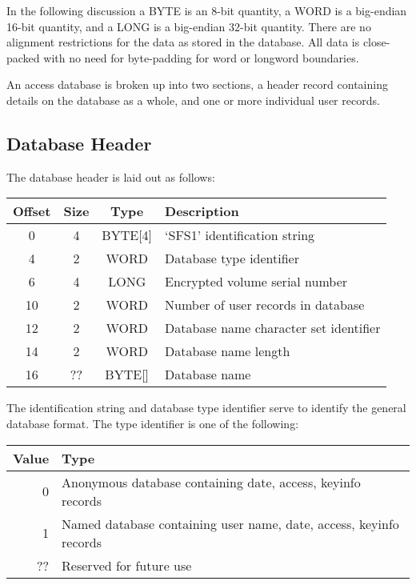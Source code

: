 In the following discussion a BYTE is an 8-bit quantity, a WORD is a
big-endian 16-bit quantity, and a LONG is a big-endian 32-bit quantity.  There are
no alignment restrictions for the data as stored in the database.  All data is
close-packed with no need for byte-padding for word or longword boundaries.

An access database is broken up into two sections, a header record containing
details on the database as a whole, and one or more individual user records.


\subsection{Database Header}

The database header is laid out as follows:

\begin{center}
\begin{tabular}{|c|c|c|l|}
\hline
    Offset & Size  &  Type     &   Description\\
\hline
       0   &   4   &  BYTE[4]  &   `SFS1' identification string\\
       4   &   2   &  WORD     &   Database type identifier\\
       6   &   4   &  LONG     &   Encrypted volume serial number\\
      10   &   2   &  WORD     &   Number of user records in database\\
      12   &   2   &  WORD     &   Database name character set identifier\\
      14   &   2   &  WORD     &   Database name length\\
      16   &  ??   &  BYTE[]   &   Database name\\
\hline
\end{tabular}
\end{center}

The identification string and database type identifier serve to identify the
general database format.  The type identifier is one of the following:

\begin{center}
\begin{tabular}{|r|l|}
\hline
    Value &  Type\\
\hline
      0   &  Anonymous database containing date, access, keyinfo records\\
      1   &  Named database containing user name, date, access, keyinfo records\\
     ??   &  Reserved for future use\\
\hline
\end{tabular}
\end{center}

